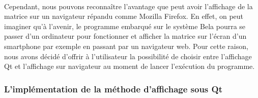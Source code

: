 \paragraph{}
Cependant, nous pouvons reconnaître l'avantage que peut avoir
l'affichage de la matrice sur un navigateur répandu comme Mozilla
Firefox. En effet, on peut imaginer qu'à l'avenir, le programme
embarqué sur le système Bela pourra se passer d'un ordinateur pour
fonctionner et afficher la matrice sur l'écran d'un smartphone par
exemple en passant par un navigateur web. Pour cette raison, nous
avons décidé d'offrir à l'utilisateur la possibilité de choisir entre
l'affichage Qt et l'affichage sur navigateur au moment de lancer
l'exécution du programme.

\subsubsection{L'implémentation de la méthode d'affichage sous Qt}
